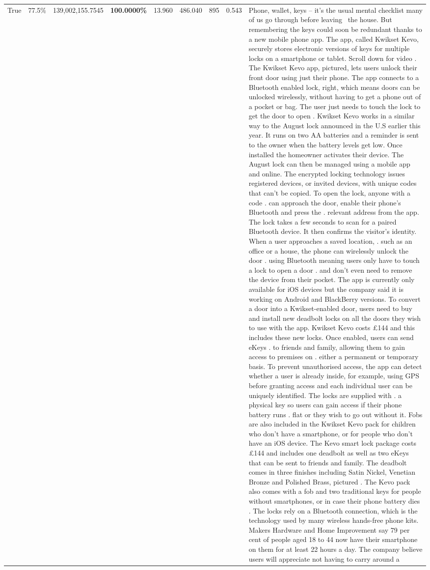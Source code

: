 \begin{table}[H]
\begin{tabular}{lllrlllll}
True & 77.5\% & 139,002,155.7545 & \bfseries \color{red} 100.0000\% & 13.960 & 486.040 & 895 & 0.543 & Phone, wallet, keys – it’s the usual mental checklist many of us go through before leaving  the house. But remembering the keys could soon be redundant thanks to a new mobile phone app. The app, called Kwikset Kevo, securely stores electronic versions of keys for multiple locks on a smartphone or tablet. Scroll down for video . The Kwikset Kevo app, pictured, lets users unlock their front door using just their phone. The app connects to a Bluetooth enabled lock, right, which means doors can be unlocked wirelessly, without having to get a phone out of a pocket or bag. The user just needs to touch the lock to get the door to open . Kwikset Kevo works in a similar way to the August lock announced in the U.S earlier this year. It runs on two AA batteries and a reminder is sent to the owner when the battery levels get low. Once installed the homeowner activates their device. The August lock can then be managed using a mobile app and online. The encrypted locking technology issues registered devices, or invited devices, with unique codes that can't be copied. To open the lock, anyone with a code . can approach the door, enable their phone's Bluetooth and press the . relevant address from the app. The lock takes a few seconds to scan for a paired Bluetooth device. It then confirms the visitor's identity. When a user approaches a saved location, . such as an office or a house, the phone can wirelessly unlock the door . using Bluetooth meaning users only have to touch a lock to open a door . and don't even need to remove the device from their pocket. The app is currently only available for iOS devices but the company said it is working on Android and BlackBerry versions. To convert a door into a Kwikset-enabled door, users need to buy and install new deadbolt locks on all the doors they wish to use with the app. Kwikset Kevo costs £144 and this includes these new locks. Once enabled, users can send eKeys . to friends and family, allowing them to gain access to premises on . either a permanent or temporary basis. To prevent unauthorised access, the app can detect whether a user is already inside, for example, using GPS before granting access and each individual user can be uniquely identified. The locks are supplied with . a physical key so users can gain access if their phone battery runs . flat or they wish to go out without it. Fobs are also included in the Kwikset Kevo pack for children who don't have a smartphone, or for people who don't have an iOS device. The Kevo smart lock package costs £144 and includes one deadbolt as well as two eKeys that can be sent to friends and family. The deadbolt comes in three finishes including Satin Nickel, Venetian Bronze and Polished Brass, pictured . The Kevo pack also comes with a fob and two traditional keys for people without smartphones, or in case their phone battery dies . The locks rely on a Bluetooth connection, which is the technology used by many wireless hands-free phone kits. Makers Hardware and Home Improvement say 79 per cent of people aged 18 to 44 now have their smartphone on them for at least 22 hours a day. The company believe users will appreciate not having to carry around a 
\end{tabular}
\end{table}
